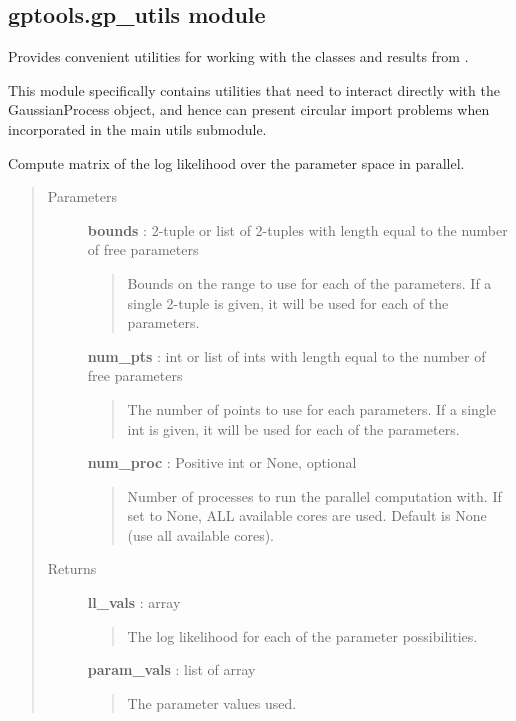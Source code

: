 \documentclass[letterpaper,10pt,english]{sphinxmanual}
\begin{document}
\subsection{gptools.gp\_utils module}
\label{gptools:gptools-gp-utils-module}\label{gptools:module-gptools.gp_utils}
Provides convenient utilities for working with the classes and results from {\hyperref[gptools:module-gptools]{}}.

This module specifically contains utilities that need to interact directly with
the GaussianProcess object, and hence can present circular import problems when
incorporated in the main utils submodule.

\begin{fulllineitems}
\label{gptools:gptools.gp_utils.parallel_compute_ll_matrix}
Compute matrix of the log likelihood over the parameter space in parallel.
\begin{quote}\begin{description}
\item[{Parameters}] \leavevmode
\textbf{bounds} : 2-tuple or list of 2-tuples with length equal to the number of free parameters
\begin{quote}

Bounds on the range to use for each of the parameters. If a single
2-tuple is given, it will be used for each of the parameters.
\end{quote}

\textbf{num\_pts} : int or list of ints with length equal to the number of free parameters
\begin{quote}

The number of points to use for each parameters. If a single int is
given, it will be used for each of the parameters.
\end{quote}

\textbf{num\_proc} : Positive int or None, optional
\begin{quote}

Number of processes to run the parallel computation with. If set to
None, ALL available cores are used. Default is None (use all available
cores).
\end{quote}

\item[{Returns}] \leavevmode
\textbf{ll\_vals} : array
\begin{quote}

The log likelihood for each of the parameter possibilities.
\end{quote}

\textbf{param\_vals} : list of array
\begin{quote}

The parameter values used.
\end{quote}

\end{description}\end{quote}

\end{fulllineitems}
\end{document}

